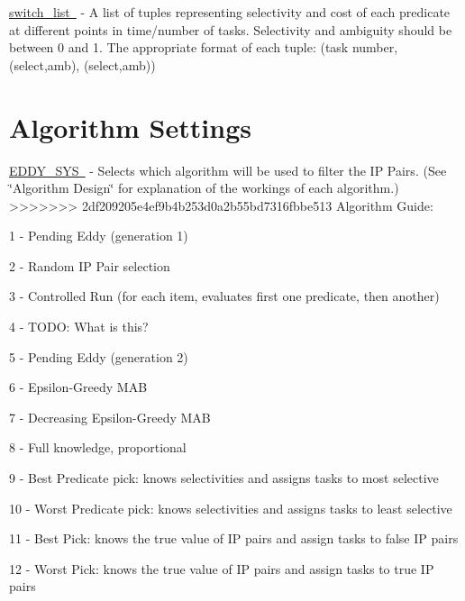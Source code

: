 \mbox{\hyperlink{}{switch\+\_\+list }} -\/ A list of tuples representing selectivity and cost of each predicate at different points in time/number of tasks. Selectivity and ambiguity should be between 0 and 1. The appropriate format of each tuple\+: (task number, (select,amb), (select,amb)) ~\newline
 \hypertarget{toggles_alg}{}\section{Algorithm Settings}\label{toggles_alg}
\mbox{\hyperlink{}{E\+D\+D\+Y\+\_\+\+S\+YS }} -\/ Selects which algorithm will be used to filter the IP Pairs. (See \char`\"{}\+Algorithm Design\char`\"{} for explanation of the workings of each algorithm.) ~\newline
>>>>>>> 2df209205e4ef9b4b253d0a2b55bd7316fbbe513
Algorithm Guide\+:
\begin{DoxyItemize}
\item 1 -\/ Pending Eddy (generation 1)
\item 2 -\/ Random IP Pair selection
\item 3 -\/ Controlled Run (for each item, evaluates first one predicate, then another)
\item 4 -\/ T\+O\+DO\+: What is this?
\item 5 -\/ Pending Eddy (generation 2)
\item 6 -\/ Epsilon-\/\+Greedy M\+AB
\item 7 -\/ Decreasing Epsilon-\/\+Greedy M\+AB
\item 8 -\/ Full knowledge, proportional
\item 9 -\/ Best Predicate pick\+: knows selectivities and assigns tasks to most selective
\item 10 -\/ Worst Predicate pick\+: knows selectivities and assigns tasks to least selective
\item 11 -\/ Best Pick\+: knows the true value of IP pairs and assign tasks to false IP pairs
\item 12 -\/ Worst Pick\+: knows the true value of IP pairs and assign tasks to true IP pairs
\end{DoxyItemize}

